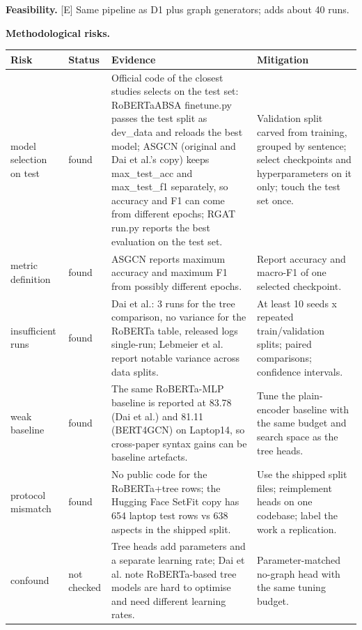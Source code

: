 \documentclass[11pt,a4paper]{article}
\begin{document}
\textbf{Feasibility.} [E] Same pipeline as D1 plus graph generators; adds about 40 runs.

\textbf{Methodological risks.}

{\small
\begin{longtable}{>{\raggedright\arraybackslash}p{}>{\raggedright\arraybackslash}p{}>{\raggedright\arraybackslash}p{}>{\raggedright\arraybackslash}p{}}
\toprule
\textbf{Risk} & \textbf{Status} & \textbf{Evidence} & \textbf{Mitigation} \\
\midrule
\endhead
model selection on test & found & [V] Official code of the closest studies selects on the test set: RoBERTaABSA finetune.py passes the test split as dev\_data and reloads the best model; ASGCN (original and Dai et al.'s copy) keeps max\_test\_acc and max\_test\_f1 separately, so accuracy and F1 can come from different epochs; RGAT run.py reports the best evaluation on the test set. \cite{dai2021syntax,zhang2019asgcn,wang2020rgat} & Validation split carved from training, grouped by sentence; select checkpoints and hyperparameters on it only; touch the test set once. \\
metric definition & found & [V] ASGCN reports maximum accuracy and maximum F1 from possibly different epochs. \cite{zhang2019asgcn} & Report accuracy and macro-F1 of one selected checkpoint. \\
insufficient runs & found & [V] Dai et al.: 3 runs for the tree comparison, no variance for the RoBERTa table, released logs single-run; Lebmeier et al. report notable variance across data splits. \cite{dai2021syntax,lebmeier2023repro} & At least 10 seeds x repeated train/validation splits; paired comparisons; confidence intervals. \\
weak baseline & found & [V] The same RoBERTa-MLP baseline is reported at 83.78 (Dai et al.) and 81.11 (BERT4GCN) on Laptop14, so cross-paper syntax gains can be baseline artefacts. \cite{dai2021syntax,xiao2021bert4gcn} & Tune the plain-encoder baseline with the same budget and search space as the tree heads. \\
protocol mismatch & found & [V] No public code for the RoBERTa+tree rows; the Hugging Face SetFit copy has 654 laptop test rows vs 638 aspects in the shipped split. \cite{dai2021syntax} & Use the shipped split files; reimplement heads on one codebase; label the work a replication. \\
confound & not checked & Tree heads add parameters and a separate learning rate; Dai et al. note RoBERTa-based tree models are hard to optimise and need different learning rates. & Parameter-matched no-graph head with the same tuning budget. \\

\end{longtable}}
\end{document}
